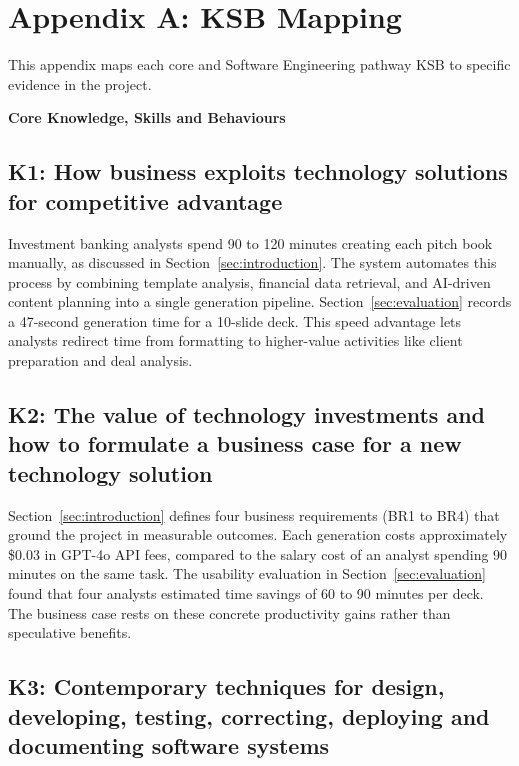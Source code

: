 \section*{Appendix A: KSB Mapping}

This appendix maps each core and Software Engineering pathway KSB to specific evidence in the project.

\vspace{1em}
\noindent\textbf{\large Core Knowledge, Skills and Behaviours}
\vspace{0.5em}

\subsection*{K1: How business exploits technology solutions for competitive advantage}

Investment banking analysts spend 90 to 120 minutes creating each pitch book manually, as discussed in Section~\ref{sec:introduction}. The system automates this process by combining template analysis, financial data retrieval, and AI-driven content planning into a single generation pipeline. Section~\ref{sec:evaluation} records a 47-second generation time for a 10-slide deck. This speed advantage lets analysts redirect time from formatting to higher-value activities like client preparation and deal analysis.

\subsection*{K2: The value of technology investments and how to formulate a business case for a new technology solution}

Section~\ref{sec:introduction} defines four business requirements (BR1 to BR4) that ground the project in measurable outcomes. Each generation costs approximately \$0.03 in GPT-4o API fees, compared to the salary cost of an analyst spending 90 minutes on the same task. The usability evaluation in Section~\ref{sec:evaluation} found that four analysts estimated time savings of 60 to 90 minutes per deck. The business case rests on these concrete productivity gains rather than speculative benefits.

\subsection*{K3: Contemporary techniques for design, developing, testing, correcting, deploying and documenting software systems}

